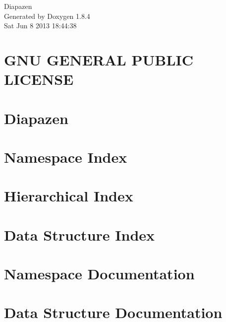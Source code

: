 \documentclass[twoside]{book}
\newcommand{\clearemptydoublepage}{%
  \newpage{\pagestyle{empty}\cleardoublepage}%
}
\begin{document}
\begin{titlepage}
\vspace*{7cm}
\begin{center}%
{\Large Diapazen }\\
\vspace*{1cm}
{\large Generated by Doxygen 1.8.4}\\
\vspace*{0.5cm}
{\small Sat Jun 8 2013 18:44:38}\\
\end{center}
\end{titlepage}
\clearemptydoublepage
\tableofcontents
\clearemptydoublepage
{}

\chapter{G\-N\-U G\-E\-N\-E\-R\-A\-L P\-U\-B\-L\-I\-C L\-I\-C\-E\-N\-S\-E}
\label{md_D:_Documents_GitHub_diapazen_LICENSE}

\chapter{Diapazen}
\label{md_D:_Documents_GitHub_diapazen_README}

\chapter{Namespace Index}

\chapter{Hierarchical Index}

\chapter{Data Structure Index}

\chapter{Namespace Documentation}

\chapter{Data Structure Documentation}



























\newpage
{}
{}
\printindex
\end{document}
